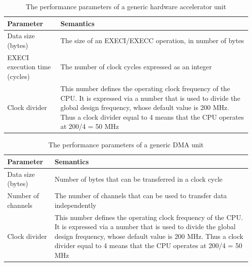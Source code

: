 \documentclass{llncs}
\begin{document}
\begin{table}[!htbp]
\begin{center}
	\caption{The performance parameters of a generic hardware accelerator unit}
	\label{tab:PerfParamHwA}
	\begin{tabular}{| >{\centering\arraybackslash}p{7cm} | >{\centering\arraybackslash}p{7cm} |} \hline
	\textbf{Parameter}				& \textbf{Semantics}	\\ \hline
	Data size (bytes)				& The size of an EXECI/EXECC operation, in number of bytes\\
	\hline
	EXECI execution time (cycles)			& The number of clock cycles expressed as an integer\\
	\hline
	Clock divider					& This number defines the operating clock frequency of the CPU.
	It is expressed via a number that is used to divide the global design frequency, whose default value is 200 MHz.
	Thus a clock divider equal to 4 means that the CPU operates at 200/4 = 50 MHz\\
	\hline
	\end{tabular}
\end{center}
\end{table}
%
\begin{table}[!htbp]
\begin{center}
	\caption{The performance parameters of a generic DMA unit}
	\label{tab:PerfParamDMA}
	\begin{tabular}{| >{\centering\arraybackslash}p{7cm} | >{\centering\arraybackslash}p{7cm} |} \hline
	\textbf{Parameter}				& \textbf{Semantics}	\\ \hline
	Data size (bytes)				& Number of bytes that can be transferred in a clock cycle \\ \hline
	Number of channels				& The number of channels that can be used to transfer data
	independently\\ \hline
	Clock divider					& This number defines the operating clock frequency of the CPU.
	It is expressed via a number that is used to divide the global design frequency, whose default value is 200 MHz.
	Thus a clock divider equal to 4 means that the CPU operates at 200/4 = 50 MHz \\ \hline
	\end{tabular}
\end{center}
\end{table}
%
\end{document}
